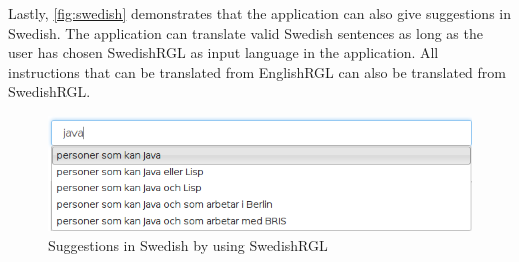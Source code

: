 Lastly, \autoref{fig:swedish} demonstrates that the application can also give suggestions in Swedish. The application can translate valid Swedish sentences as long as the user has chosen SwedishRGL as input language in the application. All instructions that can be translated from EnglishRGL can also be translated from SwedishRGL.

\begin{figure}[H]
\includegraphics[scale=0.6,keepaspectratio,valign=t]{./gfx/swedish.png}
\caption{Suggestions in Swedish by using SwedishRGL\label{fig:swedish}}
\end{figure}